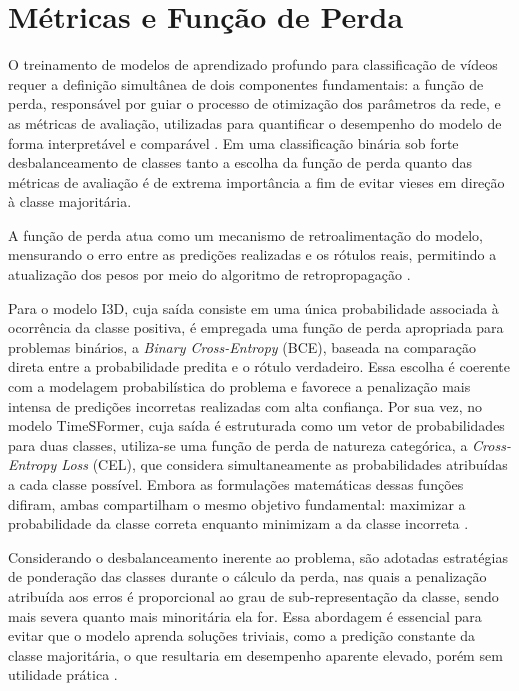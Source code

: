 \documentclass[12pt, %
openright, 
oneside, %
a4paper,    %
brazil]{facom-ufu-abntex2}
\begin{document}
\section[Métricas e Função de Perda]{Métricas e Função de Perda}

O treinamento de modelos de aprendizado profundo para classificação de vídeos requer a definição simultânea de dois componentes fundamentais: a função de perda, responsável por guiar o processo de otimização dos parâmetros da rede, e as métricas de avaliação, utilizadas para quantificar o desempenho do modelo de forma interpretável e comparável \cite{metrics}. Em uma classificação binária sob forte desbalanceamento de classes tanto a escolha da função de perda quanto das métricas de avaliação é de extrema importância a fim de evitar vieses em direção à classe majoritária.

A função de perda atua como um mecanismo de retroalimentação do modelo, mensurando o erro entre as predições realizadas e os rótulos reais, permitindo a atualização dos pesos por meio do algoritmo de retropropagação \cite{goodfellow}.

Para o modelo I3D, cuja saída consiste em uma única probabilidade associada à ocorrência da classe positiva, é empregada uma função de perda apropriada para problemas binários, a \textit{Binary Cross-Entropy} (BCE), baseada na comparação direta entre a probabilidade predita e o rótulo verdadeiro. Essa escolha é coerente com a modelagem probabilística do problema e favorece a penalização mais intensa de predições incorretas realizadas com alta confiança. Por sua vez, no modelo TimeSFormer, cuja saída é estruturada como um vetor de probabilidades para duas classes, utiliza-se uma função de perda de natureza categórica, a \textit{Cross-Entropy Loss} (CEL), que considera simultaneamente as probabilidades atribuídas a cada classe possível. Embora as formulações matemáticas dessas funções difiram, ambas compartilham o mesmo objetivo fundamental: maximizar a probabilidade da classe correta enquanto minimizam a da classe incorreta \cite{ibm}.

Considerando o desbalanceamento inerente ao problema, são adotadas estratégias de ponderação das classes durante o cálculo da perda, nas quais a penalização atribuída aos erros é proporcional ao grau de sub-representação da classe, sendo mais severa quanto mais minoritária ela for. Essa abordagem é essencial para evitar que o modelo aprenda soluções triviais, como a predição constante da classe majoritária, o que resultaria em desempenho aparente elevado, porém sem utilidade prática \cite{desbal}.
\end{document}
